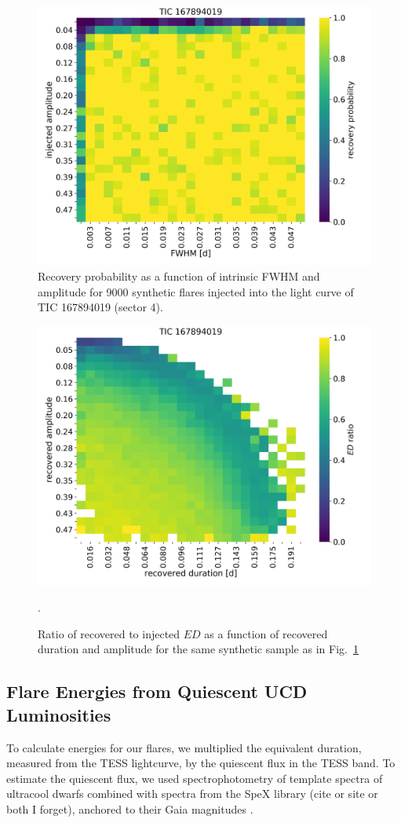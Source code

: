 \documentclass{aastex62}
\begin{document}
\begin{figure}
	\includegraphics[width=0.5\columnwidth]{figures/heatmap_recprob_TIC167894019_s0004.png}
    \caption{Recovery probability as a function of intrinsic FWHM and amplitude for 9000 synthetic flares injected into the light curve of TIC 167894019 (sector 4).}
    \label{fig:injrec_recprob}
\end{figure}

\begin{figure}
	\includegraphics[width=.5\columnwidth]{figures/heatmap_edrec_TIC167894019_s0004.png}
    \caption{Ratio of recovered to injected $ED$ as a function of recovered duration and amplitude for the same synthetic sample as in Fig.~\ref{fig:injrec_recprob}}.
    \label{fig:injrec_edrec}
\end{figure}


\subsection{Flare Energies from Quiescent UCD Luminosities} \label{subsec:tessmag}
To calculate energies for our flares, we multiplied the equivalent duration, measured from the TESS lightcurve, by the quiescent flux in the TESS band. To estimate the quiescent flux, we used spectrophotometry of template spectra of ultracool dwarfs \citep{Bochanski2007a,Schmidt2014a} combined with spectra from the SpeX library (cite or site or both I forget), anchored to their Gaia magnitudes \citep{Gaia-Collaboration2018}. 
\end{document}
